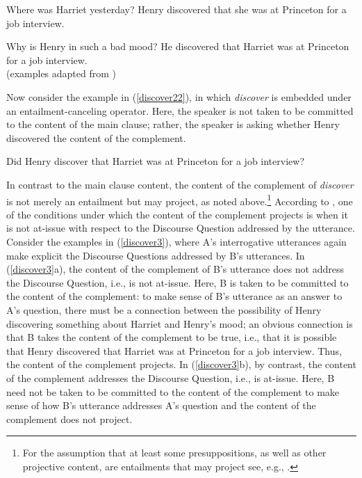 \documentclass[11pt,fleqn]{article}
\newcommand{\6}{\mbox{$[\hspace*{-.6mm}[$}}
\newcommand{\9}{\mbox{$]\hspace*{-.6mm}]$}}
\begin{document}
\begin{exe}
\ex\label{discover2}
\begin{xlist}
\ex
\begin{xlist}
 Where was Harriet yesterday?
 Henry discovered that she was at Princeton for a job interview.
\end{xlist}

\ex
\begin{xlist}
 Why is Henry in such a bad mood?
 He discovered that Harriet was at Princeton for a job interview.
\\ \hspace*{.2cm} \hfill (examples adapted from \citealt[1035]{simons07})
\end{xlist}

\end{xlist}
\end{exe}

Now consider the example in (\ref{discover22}), in which  {\em discover} is embedded under an entailment-canceling operator. Here, the speaker is not taken to be committed to the content of the main clause; rather, the speaker is asking whether Henry discovered the content of the complement.

\begin{exe}
\ex\label{discover22} Did Henry discover that Harriet was at Princeton for a job interview?
\end{exe}
In contrast to the main clause content, the content of the complement of {\em discover} is not merely an entailment but may project, as noted above.\footnote{For the assumption that at least some presuppositions, as well as other projective content, are entailments that may project see, e.g., \citealt{gazdar79b,barker02,schlenker10,abrusan2011,abrusan2016,anand-hacquard2014}. } According to \citealt{best-question}, one of the conditions under which the content of the complement projects is when it is not at-issue with respect to the Discourse Question addressed by the utterance. Consider the examples in (\ref{discover3}), where A's interrogative utterances again make explicit the Discourse Questions addressed by B's utterances. In (\ref{discover3}a), the content of the complement of B's utterance does not address the Discourse Question, i.e., is not at-issue. Here, B is taken to be committed to the content of the complement: to make sense of B's utterance as an answer to A's question, there must be a connection between the possibility of Henry discovering something about Harriet and Henry's mood; an obvious connection is that B takes the content of the complement to be true, i.e., that it is possible that Henry discovered that Harriet was at Princeton for a job interview. Thus, the content of the complement projects. In (\ref{discover3}b), by contrast, the content of the complement addresses the Discourse Question, i.e., is at-issue. Here, B need not be taken to be committed to the content of the complement to make sense of how B's utterance addresses A's question and the content of the complement does not project.
\end{document}
